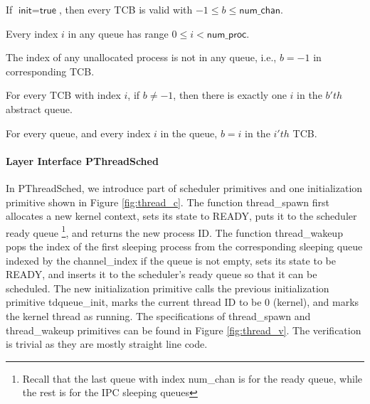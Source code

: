 \begin{invariant}
If $\textsf{init}=\textsf{true}$, then every TCB is valid with $-1\le b \le \textsf{num\_chan}$.
\end{invariant}

\begin{invariant}
Every index $i$ in any queue has range $0\le i < \textsf{num\_proc}$.
\end{invariant}

\begin{invariant}
The index of any unallocated process is not in any queue, i.e., $b=-1$ in corresponding TCB.
\end{invariant}

\begin{invariant}
For every TCB with index $i$, if $b\neq -1$, then there is exactly one $i$ in the $b'th$ abstract queue.
\end{invariant}

\begin{invariant}
For every queue, and every index $i$ in the queue, $b=i$ in the $i'th$ TCB.
\end{invariant}

\paragraph{Layer Interface PThreadSched}

In PThreadSched, we introduce part of scheduler primitives and one initialization primitive shown in
Figure \ref{fig:thread_c}. The function \textsf{thread\_spawn} first allocates a new kernel context,
sets its state to \textsf{READY}, puts it to the scheduler ready queue \footnote{Recall that
the last queue with index \textsf{num\_chan} is for the ready queue, while the rest is for the
IPC sleeping queues}, and returns the new process ID.
The function \textsf{thread\_wakeup} pops the index of the first sleeping process from the corresponding
sleeping queue indexed by the \textsf{channel\_index} if the queue is not empty, sets its state to be \textsf{READY},
and inserts it to the scheduler's ready queue so that it can be scheduled.
The new initialization primitive calls the previous initialization primitive \textsf{tdqueue\_init}, marks
the current thread ID to be 0 (kernel), and marks the kernel thread as running.
The specifications of \textsf{thread\_spawn} and \textsf{thread\_wakeup} primitives can be found
in Figure \ref{fig:thread_v}. The verification is trivial as they are mostly straight line code.

